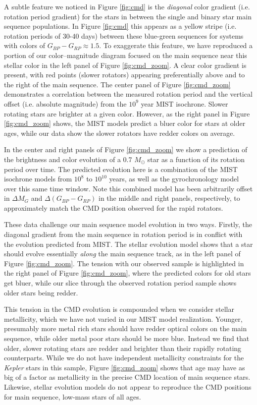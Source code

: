 \documentclass[preprint2]{aastex62}
\newcommand{\Kepler}{\textsl{Kepler}\xspace}
\begin{document}
A subtle feature we noticed in Figure \ref{fig:cmd} is the {\it diagonal} color gradient (i.e. rotation period gradient) for the stars in between the single and binary star main sequence populations. In Figure \ref{fig:cmd} this appears as a yellow stripe (i.e. rotation periods of 30-40 days) between these blue-green sequences for systems with colors of $G_{BP} - G_{RP} \approx 1.5$. To exaggerate this feature, we have reproduced a portion of our color--magnitude diagram focused on the main sequence near this stellar color in the left panel of Figure \ref{fig:cmd_zoom}. A clear color gradient is present, with red points (slower rotators) appearing preferentially above and to the right of the main sequence.
The center panel of Figure \ref{fig:cmd_zoom} demonstrates a correlation between the measured rotation period and the vertical offset (i.e. absolute magnitude) from the $10^9$ year MIST isochrone. Slower rotating stars are brighter at a given color.
However, as the right panel in Figure \ref{fig:cmd_zoom} shows, the MIST models predict a bluer color for stars at older ages, while our data show the slower rotators have redder colors on average.

In the center and right panels of Figure \ref{fig:cmd_zoom} we show a prediction of the brightness and color evolution of a 0.7 $M_\odot$ star as a function of its rotation period over time. The predicted evolution here is a combination of the MIST isochrone models from $10^8$ to $10^{10}$ years, as well as the \citet{meibom2009} gyrochronology model over this same time window. Note this  combined model has been arbitrarily offset in $\Delta M_G$ and $\Delta(G_{BP} - G_{RP})$ in the middle and right panels, respectively, to approximately match the CMD position observed for the rapid rotators. 

These data challenge our main sequence model evolution in two ways. Firstly, the diagonal gradient from the main sequence in rotation period is in conflict with the evolution predicted from MIST. The stellar evolution model shows that a star should evolve essentially {\it along} the main sequence track, as in the left panel of Figure \ref{fig:cmd_zoom}. The tension with our observed sample is highlighted in the right panel of Figure \ref{fig:cmd_zoom}, where the predicted colors for old stars get bluer, while our slice through the observed rotation period sample shows older stars being redder.

This tension in the CMD evolution is compounded when we consider stellar metallicity, which we have not varied in our MIST model realization. Younger, presumably more metal rich stars should have redder optical colors on the main sequence, while older metal poor stars should be more blue. Instead we find that older, slower rotating stars are redder and brighter than their rapidly rotating counterparts. While we do not have independent metallicity constraints for the \Kepler stars in this sample, Figure \ref{fig:cmd_zoom} shows that age may have as big of a factor as metallicity in the precise CMD location of main sequence stars. Likewise, stellar evolution models do not appear to reproduce the CMD positions for main sequence, low-mass stars of all ages.
\end{document}
